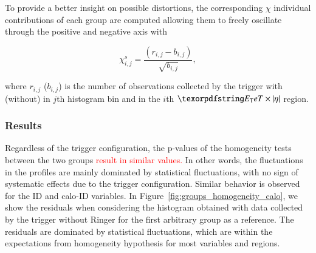 To provide a better insight on possible distortions, the corresponding $\chi$
individual contributions of each group are computed allowing them to freely
oscillate through the positive and negative axis with

\begin{equation}
  \chi_{i,j}^{s} = \frac{(r_{i,j} - b_{i,j})}{\sqrt{b_{i,j}}},
  \label{eq:signed_chi}
\end{equation}

\noindent where $r_{i,j}$ ($b_{i,j}$) is the number of observations collected by
the trigger with (without) \rnn{} in $j$th histogram bin and in the $i$th
$\et{}\times\abseta{}$ region.




\subsubsection{Results}\label{top:agreement_homogeneity_results}




Regardless of the trigger configuration, the p-values of the homogeneity tests between the two groups \textcolor{red}{result in similar values.} In other words, the fluctuations in the profiles are mainly dominated by statistical fluctuations, with no sign of systematic effects due to the trigger configuration. Similar behavior is observed for the ID and calo-ID variables. In Figure~\ref{fig:groups_homogeneity_calo}, we show the residuals when considering the histogram obtained with data collected by the trigger without Ringer for the first arbitrary group as a reference. The residuals are dominated by statistical fluctuations, which are within the expectations from homogeneity hypothesis for most variables and regions.


